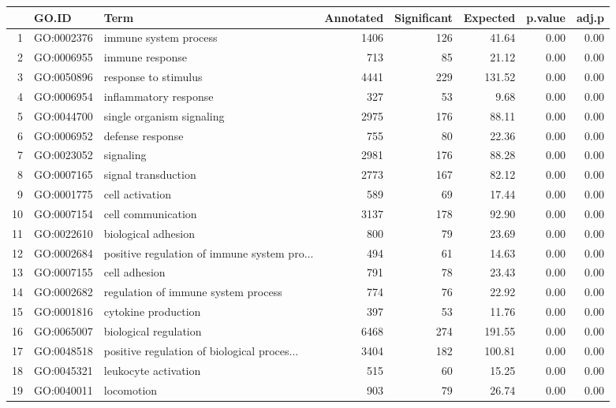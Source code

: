 \begin{table}[ht]
\centering
\begin{tabular}{rllrrrrr}
  \hline
 & GO.ID & Term & Annotated & Significant & Expected & p.value & adj.p \\ 
  \hline
1 & GO:0002376 & immune system process & 1406 & 126 & 41.64 & 0.00 & 0.00 \\ 
  2 & GO:0006955 & immune response & 713 &  85 & 21.12 & 0.00 & 0.00 \\ 
  3 & GO:0050896 & response to stimulus & 4441 & 229 & 131.52 & 0.00 & 0.00 \\ 
  4 & GO:0006954 & inflammatory response & 327 &  53 & 9.68 & 0.00 & 0.00 \\ 
  5 & GO:0044700 & single organism signaling & 2975 & 176 & 88.11 & 0.00 & 0.00 \\ 
  6 & GO:0006952 & defense response & 755 &  80 & 22.36 & 0.00 & 0.00 \\ 
  7 & GO:0023052 & signaling & 2981 & 176 & 88.28 & 0.00 & 0.00 \\ 
  8 & GO:0007165 & signal transduction & 2773 & 167 & 82.12 & 0.00 & 0.00 \\ 
  9 & GO:0001775 & cell activation & 589 &  69 & 17.44 & 0.00 & 0.00 \\ 
  10 & GO:0007154 & cell communication & 3137 & 178 & 92.90 & 0.00 & 0.00 \\ 
  11 & GO:0022610 & biological adhesion & 800 &  79 & 23.69 & 0.00 & 0.00 \\ 
  12 & GO:0002684 & positive regulation of immune system pro... & 494 &  61 & 14.63 & 0.00 & 0.00 \\ 
  13 & GO:0007155 & cell adhesion & 791 &  78 & 23.43 & 0.00 & 0.00 \\ 
  14 & GO:0002682 & regulation of immune system process & 774 &  76 & 22.92 & 0.00 & 0.00 \\ 
  15 & GO:0001816 & cytokine production & 397 &  53 & 11.76 & 0.00 & 0.00 \\ 
  16 & GO:0065007 & biological regulation & 6468 & 274 & 191.55 & 0.00 & 0.00 \\ 
  17 & GO:0048518 & positive regulation of biological proces... & 3404 & 182 & 100.81 & 0.00 & 0.00 \\ 
  18 & GO:0045321 & leukocyte activation & 515 &  60 & 15.25 & 0.00 & 0.00 \\ 
  19 & GO:0040011 & locomotion & 903 &  79 & 26.74 & 0.00 & 0.00 \\ 

\end{tabular}
\end{table}
